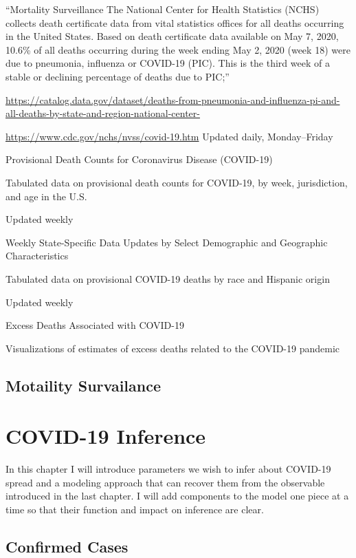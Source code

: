 \documentclass[
]{book}
\begin{document}
``Mortality Surveillance
The National Center for Health Statistics (NCHS) collects death certificate data from vital statistics offices for all deaths occurring in the United States. Based on death certificate data available on May 7, 2020, 10.6\% of all deaths occurring during the week ending May 2, 2020 (week 18) were due to pneumonia, influenza or COVID-19 (PIC). This is the third week of a stable or declining percentage of deaths due to PIC;''

\url{https://catalog.data.gov/dataset/deaths-from-pneumonia-and-influenza-pi-and-all-deaths-by-state-and-region-national-center-}

\url{https://www.cdc.gov/nchs/nvss/covid-19.htm}
Updated daily, Monday--Friday

Provisional Death Counts for Coronavirus Disease (COVID-19)

Tabulated data on provisional death counts for COVID-19, by week, jurisdiction, and age in the U.S.

Updated weekly

Weekly State-Specific Data Updates by Select Demographic and Geographic Characteristics

Tabulated data on provisional COVID-19 deaths by race and Hispanic origin

Updated weekly

Excess Deaths Associated with COVID-19

Visualizations of estimates of excess deaths related to the COVID-19 pandemic

\hypertarget{motaility-survailance}{%
\section{Motaility Survailance}\label{motaility-survailance}}

\hypertarget{covid-19-inference}{%
\chapter{COVID-19 Inference}\label{covid-19-inference}}

In this chapter I will introduce parameters we wish to infer about COVID-19 spread and a modeling approach that can recover them from the observable introduced in the last chapter. I will add components to the model one piece at a time so that their function and impact on inference are clear.

\hypertarget{confirmed-cases}{%
\section{Confirmed Cases}\label{confirmed-cases}}
\end{document}

